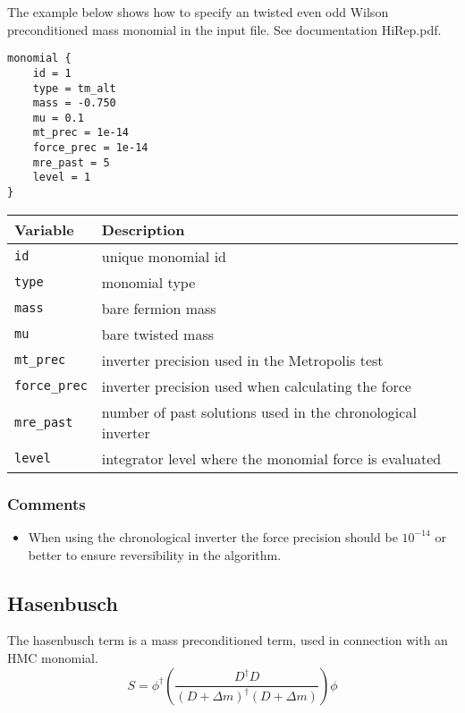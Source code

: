 \documentclass[12pt]{article}
\begin{document}
The example below shows how to specify an twisted even odd Wilson
preconditioned mass monomial in the input file. See documentation HiRep.pdf.
\begin{center}
\begin{minipage}{55mm}
\begin{framed}
\begin{verbatim}
monomial {
    id = 1
    type = tm_alt
    mass = -0.750
    mu = 0.1
    mt_prec = 1e-14
    force_prec = 1e-14
    mre_past = 5
    level = 1
}
\end{verbatim}
\vspace{-5mm}
\end{framed}
\end{minipage}
\end{center}

\vspace{2mm}

\begin{center}
\begin{tabular}{l|l}
 Variable & Description \\
 \hline
 \verb|id|         & unique monomial id \\
 \verb|type|       & monomial type \\
 \verb|mass|       & bare fermion mass \\
 \verb|mu|         & bare twisted mass\\
 \verb|mt_prec|    & inverter precision used in the Metropolis test \\
 \verb|force_prec| & inverter precision used when calculating the force \\
 \verb|mre_past|   & number of past solutions used in the chronological inverter \\
 \verb|level|      & integrator level where the monomial force is evaluated
\end{tabular}
\end{center}



\subsubsection*{Comments}
\begin{itemize}
 \item When using the chronological inverter the force precision should be $10^{-14}$ or better to ensure reversibility in the algorithm.
\end{itemize}

\newpage
\subsection*{Hasenbusch}
The hasenbusch term is a mass preconditioned term, used in connection with an HMC monomial.
\begin{equation}
 S = \phi^\dagger\left(\frac{D^\dagger D}{(D+\Delta m)^\dagger (D+\Delta m)}\right)\phi
\end{equation}
\end{document}
